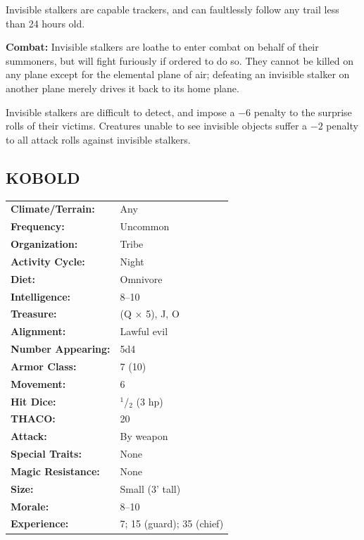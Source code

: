 \begin{multicols}{2}
Invisible stalkers are capable trackers, and can faultlessly follow any trail less than 24 hours old. 

\textbf{Combat:} Invisible stalkers are loathe to enter combat on behalf of their summoners, but will fight furiously if ordered to do so. They cannot be killed on any plane except for the elemental plane of air; defeating an invisible stalker on another plane merely drives it back to its home plane.

Invisible stalkers are difficult to detect, and impose a $-6$ penalty to the surprise rolls of their victims. Creatures unable to see invisible objects suffer a $-2$ penalty to all attack rolls against invisible stalkers.

\noindent
\begin{minipage}{\columnwidth}

\vspace{1em}

\subsection{KOBOLD}

\noindent \begin{tabular}{p{}p{}}
\textbf{Climate/Terrain:}	& Any	\\
\textbf{Frequency:} 		& Uncommon	\\
\textbf{Organization:} 		& Tribe	\\
\textbf{Activity Cycle:} 	& Night	\\
\textbf{Diet:} 				& Omnivore	\\
\textbf{Intelligence:} 		& 8--10	\\
\textbf{Treasure:} 			& (Q $\times$ 5), J, O	\\
\textbf{Alignment:} 		& Lawful evil	\\
\hline
\textbf{Number Appearing:} 	& 5d4	\\
\textbf{Armor Class:} 		& 7 (10)	\\
\textbf{Movement:} 			& 6	\\
\textbf{Hit Dice:} 			& $^1$/$_2$ (3 hp)	\\
\textbf{THACO:} 			& 20	\\
\textbf{Attack:} 			& By weapon	\\
\textbf{Special Traits:} & None	\\
\textbf{Magic Resistance:} 	& None	\\
\textbf{Size:} 				& Small (3' tall)	\\
\textbf{Morale:} 			& 8--10	\\
\textbf{Experience:} 		& 7; 15 (guard); 35 (chief)	\\
\end{tabular}


\end{minipage}
\end{multicols}
